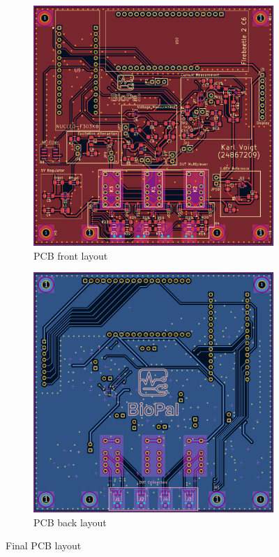 \begin{figure}[ht]
    \centering
    \begin{subfigure}[b]{0.48\textwidth}
        \centering
        \includegraphics[width=\textwidth]{BioPal_Front.png}
        \caption{PCB front layout}
        \label{fig:pcb_front}
    \end{subfigure}\hfill
    \begin{subfigure}[b]{0.48\textwidth}
        \centering
        \includegraphics[width=\textwidth]{BioPal_Back.png}
        \caption{PCB back layout}
        \label{fig:pcb_back}
    \end{subfigure}
    \caption{Final PCB layout}
    \label{fig:pcb_layout}
\end{figure}

